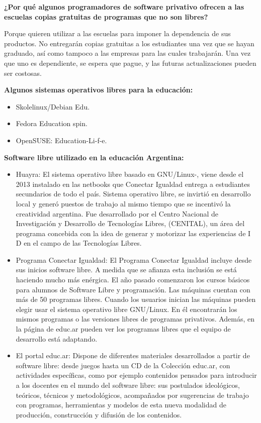 {\bf ¿Por qué algunos programadores de software privativo ofrecen a las escuelas copias gratuitas de programas que no son libres?}

Porque quieren utilizar a las escuelas para imponer la dependencia de sus productos. No entregarán copias gratuitas a los estudiantes una vez que se hayan graduado, así como tampoco a las empresas para las cuales trabajarán. Una vez que uno es dependiente, se espera que pague, y las futuras actualizaciones pueden ser costosas.


{\bf Algunos sistemas operativos libres para la educación:}
\begin{itemize}
\item Skolelinux/Debian Edu.
\item Fedora Education spin.
\item OpenSUSE: Education-Li-f-e.
\end{itemize}

{\bf Software libre utilizado en la educación Argentina:}
\begin{itemize}
\item Huayra: El sistema operativo libre basado en GNU/Linux-, viene desde el 2013 instalado en las netbooks que Conectar Igualdad entrega a estudiantes secundarios de todo el país. Sistema operativo libre, se invirtió en desarrollo local y generó puestos de trabajo al mismo tiempo que se incentivó la creatividad argentina. Fue desarrollado por el Centro Nacional de Investigación y Desarrollo de Tecnologías Libres, (CENITAL), un área del programa concebida con la idea de generar y motorizar las experiencias de I D en el campo de las Tecnologías Libres.
\item Programa Conectar Igualdad: El Programa Conectar Igualdad incluye desde sus inicios software libre. A medida que se afianza esta inclusión se está haciendo mucho más enérgica. El año pasado comenzaron los cursos básicos para alumnos de Software Libre y programación. Las máquinas cuentan con más de 50 programas libres. Cuando los usuarios inician las máquinas pueden elegir usar el sistema operativo libre GNU/Linux. En él encontrarán los mismos programas o las versiones libres de programas privativos. Además, en la página de educ.ar pueden ver los programas libres que el equipo de desarrollo está adaptando.
\item El portal educ.ar: Dispone de diferentes materiales desarrollados a partir de software libre: desde juegos hasta un CD de la Colección educ.ar, con actividades específicas, como por ejemplo contenidos pensados para introducir a los docentes en el mundo del software libre: sus postulados ideológicos, teóricos, técnicos y metodológicos, acompañados por sugerencias de trabajo con programas, herramientas y modelos de esta nueva modalidad de producción, construcción y difusión de los contenidos.
\end{itemize}

